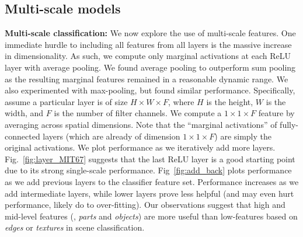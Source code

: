 \documentclass[10pt,twocolumn,letterpaper]{article}
\begin{document}
\subsection{Multi-scale models} 
{\bf Multi-scale classification:} We now explore the use of multi-scale features. One immediate hurdle to including all features from all layers is the massive increase in dimensionality. As such, we compute only marginal activations at each ReLU layer with average pooling. We found average pooling to outperform sum pooling as the resulting marginal features remained in a reasonable dynamic range. We also experimented with max-pooling, but found similar performance. Specifically, assume a particular layer is of size $H \times W \times F$, where $H$ is the height, $W$ is the width, and $F$ is the number of filter channels. We compute a $1 \times 1 \times F$ feature by averaging across spatial dimensions. Note that the ``marginal activations'' of fully-connected layers (which are already of dimension $1 \times 1 \times F$) are simply the original activations. We plot performance as we iteratively add more layers. Fig.~\ref{fig:layer_MIT67} suggests that the last ReLU layer is a good starting point due to its strong single-scale performance. Fig~\ref{fig:add_back} plots performance as we add previous layers to the classifier feature set. Performance increases as we add intermediate layers, while lower layers prove less helpful (and may even hurt performance, likely do to over-fitting). Our observations suggest that high and mid-level features (\ie, \textit{parts} and \textit{objects}) are more useful than low-features based on \textit{edges} or \textit{textures} in scene classification. 



\end{document}
